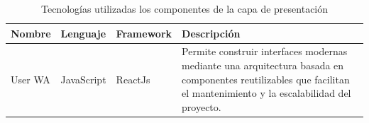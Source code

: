 \documentclass[a4paper,11 pt]{article}
\begin{document}
    \begin{table}[H]
    \footnotesize{
        \centering
        \begin{tabular}{|M{2cm}|M{2cm}|M{2cm}|M{8cm}|}
            \hline
             \textbf{Nombre} & \textbf{Lenguaje} & \textbf{Framework} & \textbf{Descripción}\\
             \hline
             User WA & JavaScript & ReactJs & Permite construir interfaces modernas mediante una arquitectura basada en componentes reutilizables que facilitan el mantenimiento y la escalabilidad del proyecto.\\
             \hline 
        \end{tabular}
        \caption{\centering Tecnologías utilizadas los componentes de la capa de presentación}
        \label{t02}}
    \end{table}
\end{document}
